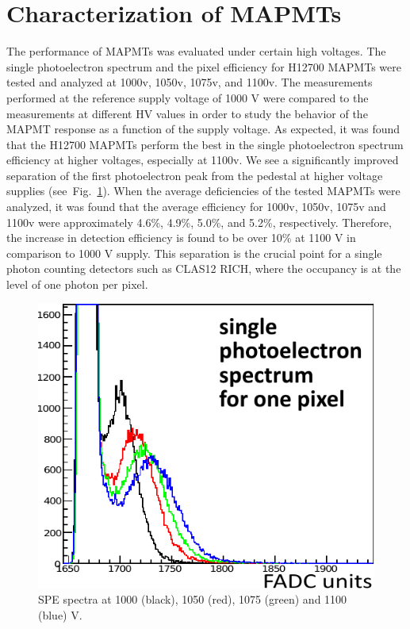 \section{Characterization of MAPMTs}
The performance of MAPMTs was evaluated under certain high voltages.
The single photoelectron spectrum and the pixel efficiency for H12700 MAPMTs were tested and analyzed at 1000v, 1050v, 1075v, and 1100v.
The measurements performed at the reference supply voltage of 1000 V were compared to the measurements at different HV values in order to study the behavior of the MAPMT response as a function of the supply voltage.
As expected, it was found that the H12700 MAPMTs perform the best in the single photoelectron spectrum efficiency at higher voltages, especially at 1100v.
We see a significantly improved separation of the first photoelectron peak from the pedestal at higher voltage supplies (see~Fig.~\ref{fig:SPEhv}).
When the average deficiencies of the tested MAPMTs were analyzed, it was found that the average efficiency for 1000v, 1050v, 1075v and 1100v were approximately 4.6\%, 4.9\%, 5.0\%, and 5.2\%, respectively.
Therefore, the increase in detection efficiency is found to be over 10\% at 1100 V in comparison to 1000 V supply.
This separation is the crucial point for a single photon counting detectors such as CLAS12 RICH, where the occupancy is at the level of one photon per pixel.

\begin{figure}[ht]
    \centering
	\begin{tcolorbox}[halign=center,colback=white,colbacktitle=red!40!white,colframe=red!80!white,left=0pt,right=0pt,top=0pt,bottom=0pt,boxrule=4pt,title={\bfseries\color{black}OLD data, to be removed}]
	\includegraphics[width=0.8\linewidth]{figures/SPEhv.pdf}
	\caption{SPE spectra at 1000 (black), 1050 (red), 1075 (green) and 1100 (blue) V.}
	\label{fig:SPEhv}
    \end{tcolorbox}
\end{figure}


